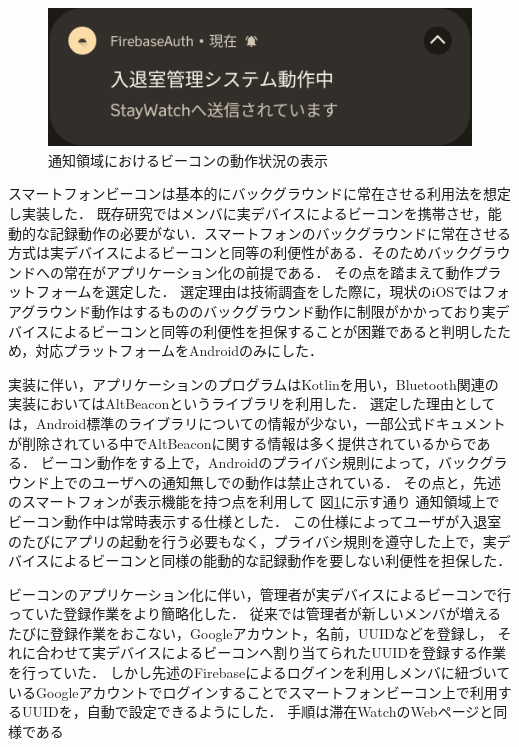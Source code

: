\begin{figure}[tbh]
  \centering
  \includegraphics[width=12cm]{image/AppNofication.png}
  \caption{通知領域におけるビーコンの動作状況の表示}
  \label{fig:AppNofication}
\end{figure}


スマートフォンビーコンは基本的にバックグラウンドに常在させる利用法を想定し実装した．
既存研究ではメンバに実デバイスによるビーコンを携帯させ，能動的な記録動作の必要がない．スマートフォンのバックグラウンドに常在させる方式は実デバイスによるビーコンと同等の利便性がある．そのためバックグラウンドへの常在がアプリケーション化の前提である．
その点を踏まえて動作プラットフォームを選定した．
選定理由は技術調査をした際に，現状のiOSではフォアグラウンド動作はするもののバックグラウンド動作に制限がかかっており実デバイスによるビーコンと同等の利便性を担保することが困難であると判明したため，対応プラットフォームをAndroidのみにした．

実装に伴い，アプリケーションのプログラムはKotlinを用い，Bluetooth関連の実装においてはAltBeaconというライブラリを利用した．
選定した理由としては，Android標準のライブラリについての情報が少ない，一部公式ドキュメントが削除されている中でAltBeaconに関する情報は多く提供されているからである．
ビーコン動作をする上で，Androidのプライバシ規則によって，バックグラウンド上でのユーザへの通知無しでの動作は禁止されている．
その点と，先述のスマートフォンが表示機能を持つ点を利用して 図\ref{fig:AppNofication}に示す通り   通知領域上でビーコン動作中は常時表示する仕様とした．
この仕様によってユーザが入退室のたびにアプリの起動を行う必要もなく，プライバシ規則を遵守した上で，実デバイスによるビーコンと同様の能動的な記録動作を要しない利便性を担保した．

ビーコンのアプリケーション化に伴い，管理者が実デバイスによるビーコンで行っていた登録作業をより簡略化した．
従来では管理者が新しいメンバが増えるたびに登録作業をおこない，Googleアカウント，名前，UUIDなどを登録し，
それに合わせて実デバイスによるビーコンへ割り当てられたUUIDを登録する作業を行っていた．
しかし先述のFirebaseによるログインを利用しメンバに紐づいているGoogleアカウントでログインすることでスマートフォンビーコン上で利用するUUIDを，自動で設定できるようにした．
手順は滞在WatchのWebページと同様である

